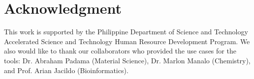 


\section*{Acknowledgment}
This work is supported by the Philippine Department of Science and Technology Accelerated Science and Technology Human Resource Development Program. We also would like to thank our collaborators who provided the use cases for the tools: Dr. Abraham Padama (Material Science), Dr. Marlon Manalo (Chemistry), and Prof. Arian Jacildo (Bioinformatics).




